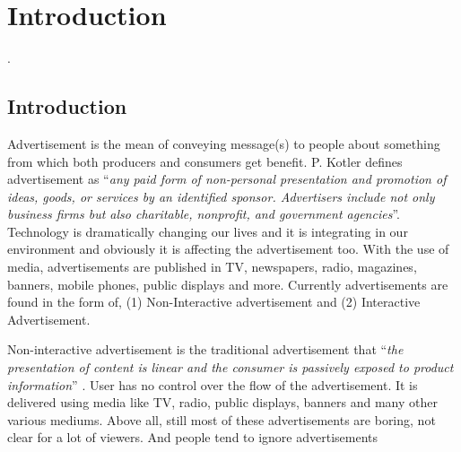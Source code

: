 
\chapter{Introduction} %

\label{Chapter1} %
\newpage
.
\newpage

\section{Introduction}
Advertisement is the mean of conveying message(s) to people about something from which both producers and consumers get benefit. P. Kotler \cite{ad_def} defines advertisement as ``\emph{any paid form of non-personal presentation and promotion of ideas, goods, or services by an identified sponsor. Advertisers include not only business firms but also charitable, nonprofit, and government agencies}''. Technology is dramatically changing our lives and it is integrating in our environment and obviously it is affecting the advertisement too. With the use of media, advertisements are published in TV, newspapers, radio, magazines, banners, mobile phones, public displays and more. Currently advertisements are found in the form of, (1) Non-Interactive advertisement and (2) Interactive Advertisement.

Non-interactive advertisement is the traditional advertisement that ``\emph{the presentation of content is linear and the consumer is passively exposed to product information}'' \cite{Non_inter_vs_interAd}. User has no control over the flow of the advertisement. It is delivered using media like TV, radio, public displays, banners and many other various mediums. Above all, still most of these advertisements are boring, not clear for a lot of viewers. And people tend to ignore advertisements \cite{display_blindness, banner_blindness}

